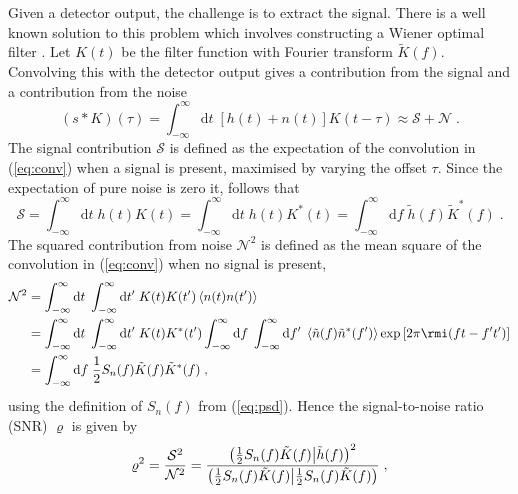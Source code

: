 Given a detector output, the challenge is to extract the signal. There is a well known solution to this problem which involves constructing a Wiener optimal filter \citep{Wiener49}. Let $K(t)$ be the filter function with Fourier transform $\tilde{K}(f)$. Convolving this with the detector output gives a contribution from the signal and a contribution from the noise
\begin{equation}\label{eq:conv}
\left(s*K\right)(\tau) = \int_{-\infty}^{\infty}\mathrm{d}t\;\left[h(t)+n(t)\right]K(t-\tau) \approx \mathcal{S} + \mathcal{N} \; .
\end{equation}
The signal contribution $\mathcal{S}$ is defined as the expectation of the convolution in (\ref{eq:conv}) when a signal is present, maximised by varying the offset $\tau$.  Since the expectation of pure noise is zero it, follows that
\begin{equation}
\mathcal{S} = \int_{-\infty}^{\infty}\mathrm{d}t\;h(t)K(t)=\int_{-\infty}^{\infty}\mathrm{d}t\;h(t)K^{*}(t)=\int_{-\infty}^{\infty}\mathrm{d}f\; \tilde{h}(f)\tilde{K}^{*}(f) \; .
\end{equation}
The squared contribution from noise $\mathcal{N}^{2}$ is defined as the mean square of the convolution in (\ref{eq:conv}) when no signal is present,
\begin{eqnarray} 
\mathcal{N}^{2} &= \int_{-\infty}^{\infty}\mathrm{d}t\;\int_{-\infty}^{\infty}\mathrm{d}t'\;K(t)K(t')\left<n(t)n(t')\right> \nonumber \\
 &= \int_{-\infty}^{\infty}\mathrm{d}t\;\int_{-\infty}^{\infty}\mathrm{d}t'\;K(t)K^{*}(t')\int_{-\infty}^{\infty}\mathrm{d}f\;\int_{-\infty}^{\infty}\mathrm{d}f'\;\left<\tilde{n}(f)\tilde{n}^{*}(f')\right>\exp\left[2\pi\rmi(ft-f't')\right]\nonumber \\
 &= \int_{-\infty}^{\infty}\mathrm{d}f \; \frac{1}{2}S_{n}(f)\tilde{K}(f)\tilde{K}^{*}(f) \; ,
 \end{eqnarray}
using the definition of $S_{n}(f)$ from (\ref{eq:psd}). Hence the signal-to-noise ratio (SNR) $\varrho$ is given by
\begin{equation}\label{eq:SNRinnerprod} 
\varrho^{2} = \frac{\mathcal{S}^{2}}{\mathcal{N}^{2}}= \frac{\left({\frac{1}{2}S_{n}(f)\tilde{K}(f)}\middle|{\tilde{h}(f)}\right)^{2}}{\left({\frac{1}{2}S_{n}(f)\tilde{K}(f)}\middle|{\frac{1}{2}S_{n}(f)\tilde{K}(f)}\right)} \;,
\end{equation}
